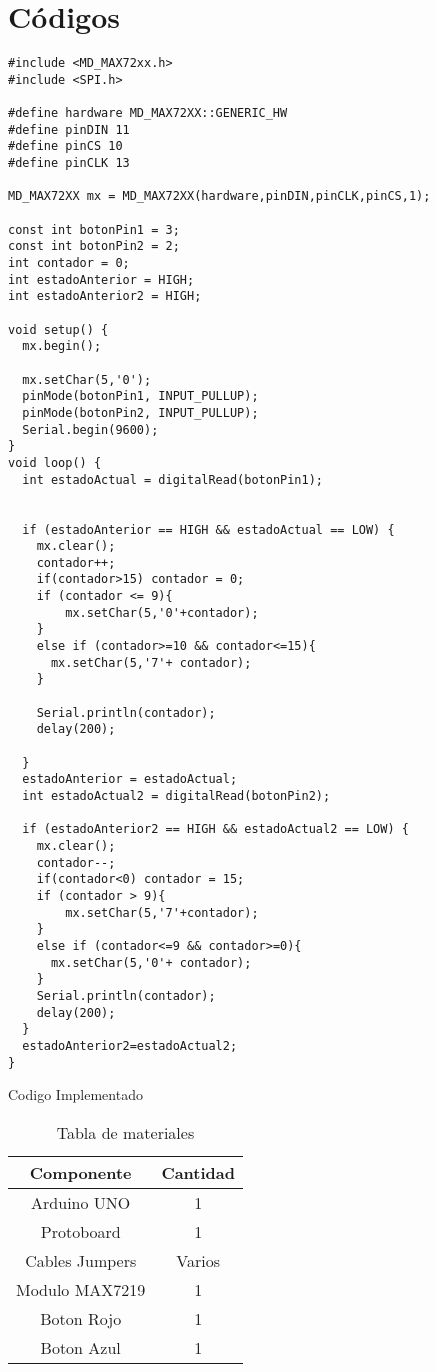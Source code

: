 \section{Códigos}

\begin{listing}[H]
  \scriptsize
  \begin{verbatim}
#include <MD_MAX72xx.h>
#include <SPI.h>

#define hardware MD_MAX72XX::GENERIC_HW
#define pinDIN 11
#define pinCS 10
#define pinCLK 13

MD_MAX72XX mx = MD_MAX72XX(hardware,pinDIN,pinCLK,pinCS,1);

const int botonPin1 = 3;  
const int botonPin2 = 2;
int contador = 0;         
int estadoAnterior = HIGH; 
int estadoAnterior2 = HIGH;

void setup() {
  mx.begin();
  
  mx.setChar(5,'0');
  pinMode(botonPin1, INPUT_PULLUP); 
  pinMode(botonPin2, INPUT_PULLUP);
  Serial.begin(9600);
}
void loop() {
  int estadoActual = digitalRead(botonPin1);
  

  if (estadoAnterior == HIGH && estadoActual == LOW) {
    mx.clear();
    contador++;
    if(contador>15) contador = 0;
    if (contador <= 9){
        mx.setChar(5,'0'+contador);
    }
    else if (contador>=10 && contador<=15){
      mx.setChar(5,'7'+ contador);
    }
    
    Serial.println(contador);
    delay(200); 
    
  }
  estadoAnterior = estadoActual; 
  int estadoActual2 = digitalRead(botonPin2);
 
  if (estadoAnterior2 == HIGH && estadoActual2 == LOW) {
    mx.clear();
    contador--;
    if(contador<0) contador = 15;
    if (contador > 9){
        mx.setChar(5,'7'+contador);
    }
    else if (contador<=9 && contador>=0){
      mx.setChar(5,'0'+ contador);
    }
    Serial.println(contador);
    delay(200); 
  }
  estadoAnterior2=estadoActual2;
}
  \end{verbatim}
  \caption{Codigo Implementado}
  \label{lst:cod-1}
\end{listing}
\clearpage 
\begin{table}
  \centering
  \begin{tabular}{||c|c||}
    \hline
    Componente & Cantidad \\ \hline \hline
    Arduino UNO & 1 \\ 
    Protoboard & 1 \\ 
    Cables Jumpers & Varios \\ 
    Modulo MAX7219 & 1 \\ 
    Boton Rojo & 1 \\ 
    Boton Azul & 1 \\ \hline
  \end{tabular}
  \caption{Tabla de materiales}
  \label{tab:materiales}
\end{table}
